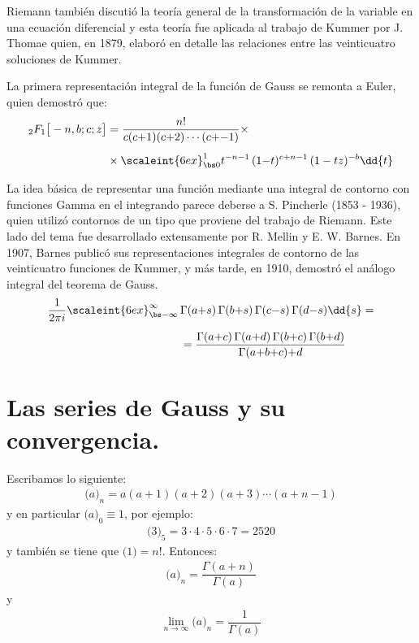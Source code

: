 Riemann también discutió la teoría general de la transformación de la variable en una ecuación diferencial y esta teoría fue aplicada al trabajo de Kummer por J. Thomae quien, en 1879, elaboró en detalle las relaciones entre las veinticuatro soluciones de Kummer.
\par
La primera representación integral de la función de Gauss se remonta a Euler, quien demostró que:
\begin{align}
\begin{aligned}[b]
{}_{2} F_{1} \big[ -n, b; c; z \big] &= \dfrac{n!}{c (c {+} 1)(c {+} 2) \cdots (c {+} {-} 1)} \times \\[0.5em]
&\times \scaleint{6ex}_{\bs 0}^{1} t^{-n-1} \, (1 {-} t)^{c+n-1} \, (1 - t z)^{-b} \dd{t}
\end{aligned}
\label{eq:ecuacion_01_01_07}
\end{align}

La idea básica de representar una función mediante una integral de contorno con funciones Gamma en el integrando parece deberse a S. Pincherle (1853 - 1936), quien utilizó contornos de un tipo que proviene del trabajo de Riemann. Este lado del tema fue desarrollado extensamente por R. Mellin y E. W. Barnes. En 1907, Barnes publicó sus representaciones integrales de contorno de las veinticuatro funciones de Kummer, y más tarde, en 1910, demostró el análogo integral del teorema de Gauss.
\begin{align}
\begin{aligned}[b]
\dfrac{1}{2 \pi i} \scaleint{6ex}_{\bs -\infty}^{\infty} \, &\Gamma (a {+} s) \, \Gamma (b {+} s) \, \Gamma(c {-} s) \, \Gamma (d {-} s) \dd{s} = \\[0.5em]
&= \dfrac{\Gamma (a {+} c) \, \Gamma (a {+} d) \, \Gamma(b {+} c) \, \Gamma (b {+} d)}{\Gamma (a {+} b {+} c) {+ d}}
\end{aligned}
\label{eq:ecuacion_01_01_08}
\end{align}

\newpage
\section{Las series de Gauss y su convergencia.}

Escribamos lo siguiente:
\begin{align}
\big( a \big)_{n} = a ( a + 1)(a + 2)(a + 3) \cdots (a + n - 1)
\label{eq:ecuacion_01_01_01_01}
\end{align}
y en particular $\big( a \big)_{0} \equiv 1$, por ejemplo:
\begin{align*}
\big( 3 \big)_{5} = 3 \cdot 4 \cdot 5 \cdot 6 \cdot 7 = 2520
\end{align*}
y también se tiene que $\big( 1 \big) = n!$. Entonces:
\begin{align}
\big( a \big)_{n} = \dfrac{\Gamma (a + n)}{\Gamma (a)}
\label{eq:ecuacion_01_01_01_02}
\end{align}
y
\begin{align}
\lim_{n \to \infty} \big( a \big)_{n} = \dfrac{1}{\Gamma (a)}
\label{eq:ecuacion_01_01_01_03}
\end{align}

